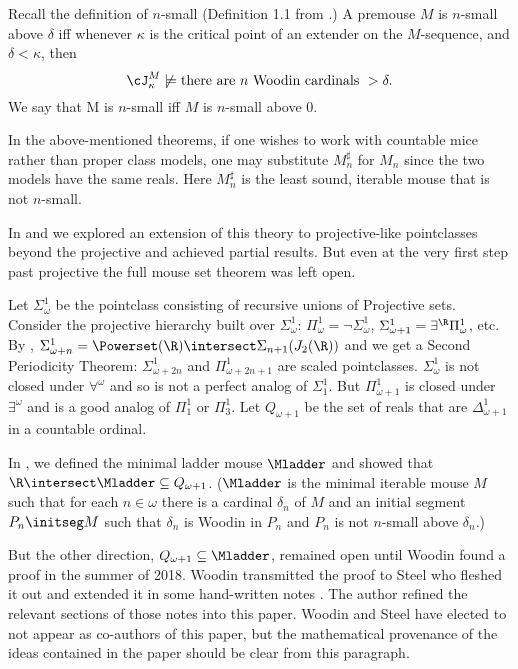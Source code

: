 \documentclass[oneside,12pt]{amsart}
\begin{document}
Recall the definition of $n$-small (Definition 1.1 from \cite{Proj_WO_In_Mod}.) A premouse $M$ is $n$-small above $\delta$ 
iff whenever $\kappa$ is the critical point of an extender on the $M$-sequence, and $\delta<\kappa$, then
$$ \cJ^M_{\kappa}\not\models \text{there are } n \text{ Woodin cardinals } > \delta.$$
We say that M is $n$-small iff $M$ is $n$-small above $0$.

In the above-mentioned theorems, if one wishes to work with countable mice rather than proper class models, one may substitute
$M_n^{\sharp}$ for $M_n$ since the two models have the same reals. Here $M_n^{\sharp}$ is the least sound, iterable mouse
that is not $n$-small.

In \cite{My_Thesis} and \cite{Mouse_Sets} we explored an extension of this theory
to projective-like pointclasses beyond the projective and achieved partial results.
But even at the very first step past projective the full mouse set theorem was left open.

Let $\Sigma^1_{\omega}$
be the pointclass consisting of recursive unions of Projective sets. Consider
the projective hierarchy built over $\Sigma^1_{\omega}$:
$\Pi^1_{\omega} = \neg \Sigma^1_{\omega}$,
$\Sigma^1_{\omega+1} = \exists^{\R} \Pi^1_{\omega}$, etc.
By \cite{Scales_In_LofR}, $\Sigma^1_{\omega+n} = \Powerset(\R)\intersect \Sigma_{n+1}(J_2(\R))$
and we get a Second Periodicity Theorem: $\Sigma^1_{\omega+2n}$ and $\Pi^1_{\omega+2n+1}$ are scaled pointclasses.
$\Sigma^1_{\omega}$ is not closed under $\forall^{\omega}$ and so is not a perfect analog of $\Sigma^1_1$.
But $\Pi^1_{\omega+1}$ is closed under $\exists^{\omega}$ and is a good analog of $\Pi^1_1$ or $\Pi^1_3$.
Let $Q_{\omega+1}$ be the set of reals that are $\Delta^1_{\omega+1}$ in a countable ordinal.

In \cite{My_Thesis}, we defined the minimal ladder mouse $\Mladder$ and showed that
$\R\intersect\Mladder\subseteq Q_{\omega+1}$. ($\Mladder$ is the minimal iterable mouse $M$ such
that for each $n\in\omega$ there is a cardinal $\delta_n$ of $M$ and an initial segment $P_n \initseg M$
such that $\delta_n$ is Woodin in $P_n$ and $P_n$ is not $n$-small above $\delta_n$.)

But the other direction, $Q_{\omega+1} \subseteq \Mladder$, remained open until
Woodin found a proof in the summer of 2018. Woodin transmitted the proof to Steel who fleshed it out
and extended it in some hand-written notes \cite{Mouse_Pairs_and_Suslin_Cardinals}.
The author refined the relevant sections of those notes into this paper.
Woodin and Steel have elected to not appear as co-authors of this paper,
but the mathematical provenance of the ideas contained in the paper should be clear from this paragraph.
\end{document}
